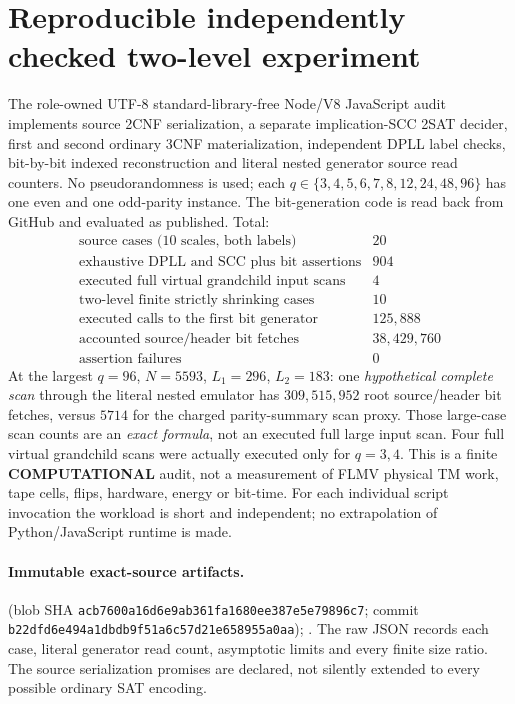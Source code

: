 \documentclass[11pt]{article}
\begin{document}
\section{Reproducible independently checked two-level experiment}
The role-owned UTF-8 standard-library-free Node/V8 JavaScript audit
implements source 2CNF serialization, a separate implication-SCC 2SAT
decider, first and second ordinary 3CNF materialization, independent
DPLL label checks, bit-by-bit indexed reconstruction and literal
nested generator source read counters. No pseudorandomness is used;
each \(q\in\{3,4,5,6,7,8,12,24,48,96\}\) has one even and one
odd-parity instance. The bit-generation code is read back from GitHub
and evaluated as published. Total:
\[
\begin{array}{lr}
\text{source cases (10 scales, both labels)}&20\\
\text{exhaustive DPLL and SCC plus bit assertions}&904\\
\text{executed full virtual grandchild input scans}&4\\
\text{two-level finite strictly shrinking cases}&10\\
\text{executed calls to the first bit generator}&125{,}888\\
\text{accounted source/header bit fetches}&38{,}429{,}760\\
\text{assertion failures}&0
\end{array}
\]
At the largest \(q=96\), \(N=5593\), \(L_1=296\), \(L_2=183\):
one \emph{hypothetical complete scan} through the literal nested
emulator has \(309{,}515{,}952\) root source/header bit fetches,
versus \(5714\) for the charged parity-summary scan proxy.
Those large-case scan counts are an \emph{exact formula}, not an
executed full large input scan. Four full virtual grandchild scans
were actually executed only for \(q=3,4\). This is a finite
\textbf{COMPUTATIONAL} audit, not a measurement of FLMV physical
TM work, tape cells, flips, hardware, energy or bit-time.
For each individual script invocation the workload is short and
independent; no extrapolation of Python/JavaScript runtime is made.

\paragraph{Immutable exact-source artifacts.}
(blob SHA \texttt{acb7600a16d6e9ab361fa1680ee387e5e79896c7};
commit \texttt{b22dfd6e494a1dbdb9f51a6c57d21e658955a0aa});
.
The raw JSON records each case, literal generator read count,
asymptotic limits and every finite size ratio. The source
serialization promises are declared, not silently extended to
every possible ordinary SAT encoding.
\end{document}

